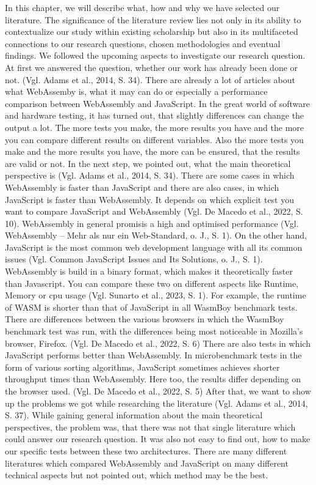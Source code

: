 In this chapter, we will describe what, how and why we have selected our literature. 
The significance of the literature review lies not only in its ability to contextualize our study within existing scholarship but also in its multifaceted connections to our research questions, chosen methodologies and eventual findings. We followed the upcoming aspects to investigate our research question. 
At first we answered the question, whether our work has already been done or not. (Vgl. Adams et al., 2014, S. 34). There are already a lot of articles about what WebAssemby is, what it may can do or especially a performance comparison between WebAssembly and JavaScript. In the great world of software and hardware testing, it has turned out, that slightly differences can change the output a lot. The more tests you make, the more results you have and the more you can compare different results on different variables. Also the more tests you make and the more results you have, the more can be ensured, that the results are valid or not.
In the next step, we pointed out, what the main theoretical perspective is (Vgl. Adams et al., 2014, S. 34). There are some cases in which WebAssembly is faster than JavaScript and there are also cases, in which JavaScript is faster than WebAssembly. It depends on which explicit test you want to compare JavaScript and WebAssembly (Vgl. De Macedo et al., 2022, S. 10). WebAssembly in general promisis a high and optimised performance (Vgl. WebAssembly – Mehr als nur ein Web-Standard, o. J., S. 1). On the other hand, JavaScript is the most common web development language with all its common issues (Vgl. Common JavaScript Issues and Its Solutions, o. J., S. 1). WebAssembly is build in a binary format, which makes it theoretically faster than Javascript. You can compare these two  on different aspects like Runtime, Memory or cpu usage (Vgl. Sunarto et al., 2023, S. 1). For example, the runtime of WASM is shorter than that of JavaScript in all WasmBoy benchmark tests. There are differences between the various browsers in which the WasmBoy benchmark test was run, with the differences being most noticeable in Mozilla's browser, Firefox. (Vgl. De Macedo et al., 2022, S. 6) There are also tests in which JavaScript performs better than WebAssembly. In microbenchmark tests in the form of various sorting algorithms, JavaScript sometimes achieves shorter throughput times than WebAssembly. Here too, the results differ depending on the browser used. (Vgl. De Macedo et al., 2022, S. 5)
After that, we want to show up the problems we got while researching the literature (Vgl. Adams et al., 2014, S. 37). While gaining general information about the main theoretical perspectives, the problem was, that there was not that single literature which could answer our research question. It was also not easy to find out, how to make our specific tests between these two architectures. There are many different literatures which compared WebAssembly and JavaScript on many different technical aspects but not pointed out, which method may be the best. 
